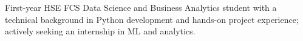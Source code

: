 

\begin{cvparagraph}

First-year HSE FCS Data Science and Business Analytics student with a technical background in Python development and hands-on project experience; actively seeking an internship in ML and analytics.
\end{cvparagraph}
